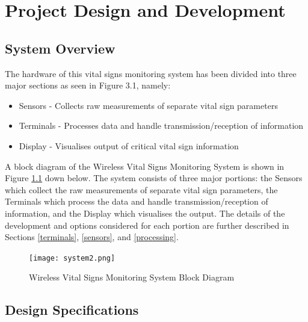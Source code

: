\chapter{Project Design and Development}


\section{System Overview}

The hardware of this vital signs monitoring system has been divided into three major sections as seen in Figure 3.1, namely: 

\begin{itemize}
	\item Sensors - Collects raw measurements of separate vital sign parameters 
	\item Terminals - Processes data and handle transmission/reception of information
	\item Display - Visualises output of critical vital sign information
\end{itemize}

A block diagram of the Wireless Vital Signs Monitoring System is shown in Figure \ref{system} down below. The system consists of three major portions: the Sensors which collect the raw measurements of separate vital sign parameters, the Terminals which process the data and handle transmission/reception of information, and the Display which visualises the output. The details of the development and options considered for each portion are further described in Sections \ref{terminals}, \ref{sensors}, and \ref{processing}.

\begin{figure}[H]
	\centering
	\texttt{[image: system2.png]}
	\caption{Wireless Vital Signs Monitoring System Block Diagram}
	\label{system}
\end{figure}

\section{Design Specifications}
\label{specifications}

